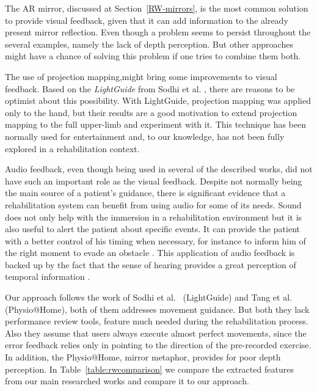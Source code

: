The \ac{AR} mirror, discussed at Section~\ref{RW-mirrors}, is the most common 
solution to provide visual feedback, given that it can add information to the already present
mirror reflection. Even though a problem seems to persist throughout the several examples, namely the lack of depth perception.
But other approaches might have a chance of solving this problem if one tries to combine them both.

The use of projection mapping,might bring some improvements to visual feedback. 
Based on the \textit{LightGuide} from Sodhi et al. \cite{Sodhi2012}, there are reasons to be optimist 
about this possibility. With LightGuide, projection mapping was applied only to the hand, but their results 
are a good motivation to extend projection mapping to the full upper-limb and experiment with it.
This technique has been normally used for entertainment and, to our knowledge, has not been fully explored 
in a rehabilitation context. 


Audio feedback, even though being used in several of the described works, did not have such an important role as the visual feedback. 
Despite not normally being the main source of a patient's guidance, there is significant evidence that a rehabilitation system 
can benefit from using audio for some of its needs.
Sound does not only help with the immersion in a rehabilitation environment but it is also useful to alert the patient about specific events. It 
can provide the patient with a better control of his timing when necessary, for instance to inform him 
of the right moment to evade an obstacle \cite{Wellner2007a}. This application of audio feedback is backed 
up by the fact that the sense of hearing provides a great perception of temporal information \cite{Sigrist2013}.

Our approach follows the work of Sodhi et al.~\cite{Sodhi2012} (LightGuide) and Tang et al.~\cite{Tang2014a} (Physio@Home), both of them addresses movement guidance. 
But both they lack performance review tools, feature much needed during the rehabilitation process.
Also they assume that users always execute almost perfect movements, since the error feedback relies only in pointing to the direction of the pre-recorded exercise.
In addition, the Physio@Home, mirror metaphor, provides for poor depth perception. In Table~\ref{table:rwcomparison} we compare the extracted features from our main researched works and compare it to our approach.

